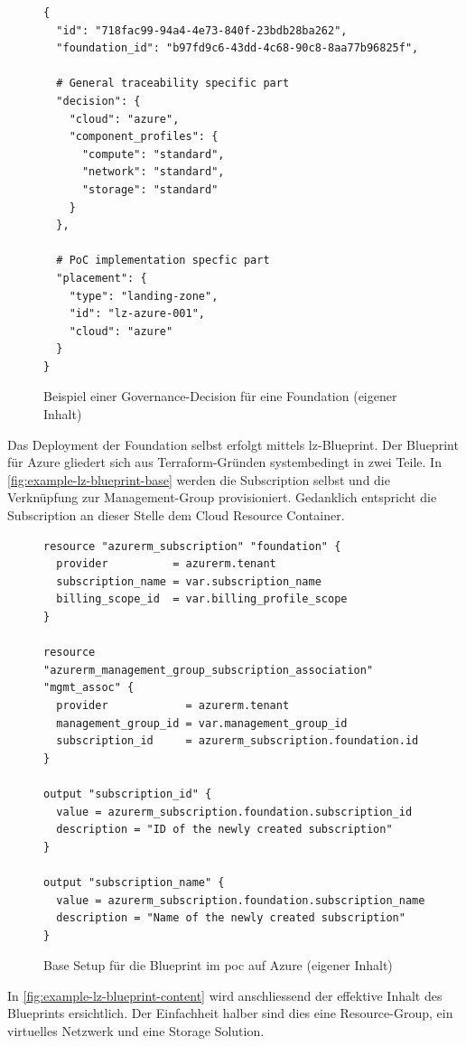 \begin{figure}[H]
\centering
\begin{lstlisting}
{
  "id": "718fac99-94a4-4e73-840f-23bdb28ba262",
  "foundation_id": "b97fd9c6-43dd-4c68-90c8-8aa77b96825f",

  # General traceability specific part
  "decision": {
    "cloud": "azure",
    "component_profiles": {
      "compute": "standard",
      "network": "standard",
      "storage": "standard"
    }
  },

  # PoC implementation specfic part
  "placement": {
    "type": "landing-zone",
    "id": "lz-azure-001",
    "cloud": "azure"
  }
}
\end{lstlisting}
\caption{Beispiel einer Governance-Decision für eine Foundation (eigener Inhalt)}
\label{fig:example-governance-decision}
\end{figure}

Das Deployment der Foundation selbst erfolgt mittels \ac{lz}-Blueprint. Der Blueprint für Azure gliedert sich aus Terraform-Gründen systembedingt in zwei Teile. In \autoref{fig:example-lz-blueprint-base} werden die Subscription selbst und die Verknüpfung zur Management-Group provisioniert. Gedanklich entspricht die Subscription an dieser Stelle dem Cloud Resource Container.

\begin{figure}[H]
\centering
\begin{verbatim}
resource "azurerm_subscription" "foundation" {
  provider          = azurerm.tenant
  subscription_name = var.subscription_name
  billing_scope_id  = var.billing_profile_scope
}

resource "azurerm_management_group_subscription_association" "mgmt_assoc" {
  provider            = azurerm.tenant
  management_group_id = var.management_group_id
  subscription_id     = azurerm_subscription.foundation.id
}

output "subscription_id" {
  value = azurerm_subscription.foundation.subscription_id
  description = "ID of the newly created subscription"
}

output "subscription_name" {
  value = azurerm_subscription.foundation.subscription_name
  description = "Name of the newly created subscription"
}
\end{verbatim}
\caption{Base Setup für die Blueprint im \ac{poc} auf Azure (eigener Inhalt)}
\label{fig:example-lz-blueprint-base}
\end{figure}

In \autoref{fig:example-lz-blueprint-content} wird anschliessend der effektive Inhalt des Blueprints ersichtlich. Der Einfachheit halber sind dies eine Resource-Group, ein virtuelles Netzwerk und eine Storage Solution.

